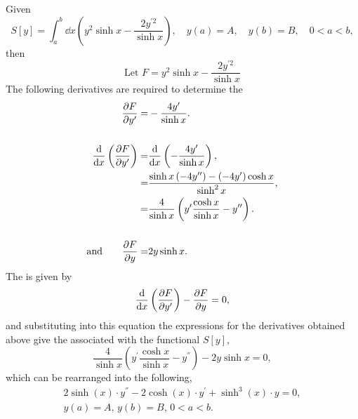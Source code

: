 Given
\[
	S[y] = \int_a^b \dd x\left(y^2\sinh x -\frac{2y^{\prime 2}}{\sinh x}\right),\quad y(a) = A,\quad y(b) = B,\quad 0< a < b,
\]
then
\[
	\textrm{Let } F = y^2\sinh x -\frac{2y^{\prime 2}}{\sinh x}
\]
The following derivatives are required to determine the \el{}
\begin{equation*}
\begin{split}
	\frac{\partial F}{\partial y^\prime} =& -\frac{4y^\prime}{\sinh x}.\\\\
	\frac{\mathrm{d}}{\mathrm{d}x}\left(\frac{\partial F}{\partial y^\prime}\right) =& \frac{\mathrm{d}}{\mathrm{d}x}\left( -\frac{4y^\prime}{\sinh x}\right),\\
	=& \frac{\sinh x\left(-4y^{\prime\prime}\right)-\left(-4y^\prime\right)\cosh x }{\sinh^2x},\\
	=& \frac{4}{\sinh x}\left(y^\prime\frac{\cosh x}{\sinh x}-y^{\prime\prime}\right).\\\\
	\textrm{and}\quad\quad{} \frac{\partial F}{\partial y}=& 2y\sinh x.
\end{split}
\end{equation*}
The \el is given by
\[
	\frac{\mathrm{d}}{\mathrm{d}x}\left(\frac{\partial F}{\partial y^\prime}\right)-\frac{\partial F}{\partial y} = 0,
\]
and substituting into this equation the expressions for the derivatives obtained above give the \el associated with the functional $S[y]$,
\[
	\frac{4}{\sinh x}\left(y^\prime\frac{\cosh x}{\sinh x}-y^\dprime\right) - 2y\sinh x = 0,
\]
which can be rearranged into the following,
\begin{gather}
	2\sinh(x)\cdot y^\dprime - 2\cosh(x)\cdot y^\prime + \sinh^3(x)\cdot y = 0, \\ 
	y(a) = A,\, y(b) = B,\, 0< a < b.\nonumber
\end{gather}